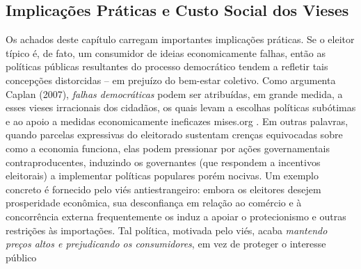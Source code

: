 \subsection*{Implicações Práticas e Custo Social dos Vieses} Os achados deste capítulo carregam importantes implicações práticas. Se o eleitor típico é, de fato, um consumidor de ideias economicamente falhas, então as políticas públicas resultantes do processo democrático tendem a refletir tais concepções distorcidas – em prejuízo do bem-estar coletivo. Como argumenta Caplan (2007), \textit{falhas democráticas} podem ser atribuídas, em grande medida, a esses vieses irracionais dos cidadãos, os quais levam a escolhas políticas subótimas e ao apoio a medidas economicamente ineficazes
mises.org
. Em outras palavras, quando parcelas expressivas do eleitorado sustentam crenças equivocadas sobre como a economia funciona, elas podem pressionar por ações governamentais contraproducentes, induzindo os governantes (que respondem a incentivos eleitorais) a implementar políticas populares porém nocivas. Um exemplo concreto é fornecido pelo viés antiestrangeiro: embora os eleitores desejem prosperidade econômica, sua desconfiança em relação ao comércio e à concorrência externa frequentemente os induz a apoiar o protecionismo e outras restrições às importações. Tal política, motivada pelo viés, acaba \textit{mantendo preços altos e prejudicando os consumidores}, em vez de proteger o interesse público
